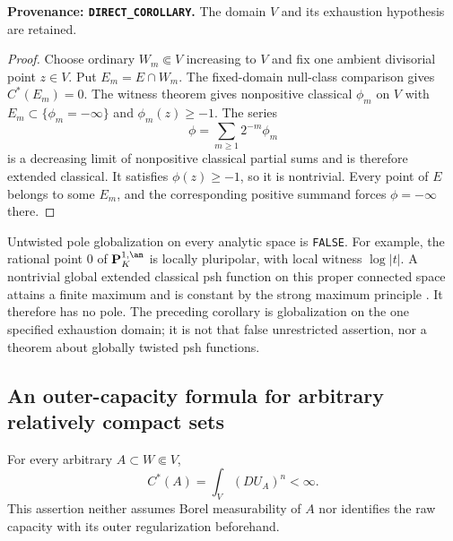 \noindent\textbf{Provenance: \texttt{DIRECT\_COROLLARY}.}
The domain $V$ and its exhaustion hypothesis are retained.

\begin{proof}
Choose ordinary $W_m\Subset V$ increasing to $V$ and fix one
ambient divisorial point $z\in V$. Put $E_m=E\cap W_m$.
The fixed-domain null-class comparison gives $C^*(E_m)=0$.
The witness theorem gives nonpositive classical $\phi_m$ on $V$
with $E_m\subset\{\phi_m=-\infty\}$ and $\phi_m(z)\geq-1$.
The series
\[
 \phi=\sum_{m\geq1}2^{-m}\phi_m
\]
is a decreasing limit of nonpositive classical partial sums and
is therefore extended classical. It satisfies $\phi(z)\geq-1$,
so it is nontrivial. Every point of $E$ belongs to some $E_m$,
and the corresponding positive summand forces $\phi=-\infty$
there.
\end{proof}

\begin{remark}
Untwisted pole globalization on every analytic space is
\texttt{FALSE}. For example, the rational point $0$ of
$\mathbf P^{1,\an}_K$ is locally pluripolar, with local witness
$\log|t|$. A nontrivial global extended classical psh function
on this proper connected space attains a finite maximum and is
constant by the strong maximum principle
\cite[Theorem 6.1]{GR25}. It therefore has no
pole. The preceding corollary is globalization on the one
specified exhaustion domain; it is not that false unrestricted
assertion, nor a theorem about globally twisted psh functions.
\end{remark}

\subsection{An outer-capacity formula for arbitrary relatively compact sets}

\begin{theorem}
\label{thm:r2-arbitrary-extremal-mass}
For every arbitrary $A\subset W\Subset V$,
\[
 C^*(A)=\int_V(DU_A)^n<\infty.
\]
This assertion neither assumes Borel measurability of $A$ nor
identifies the raw capacity with its outer regularization beforehand.
\end{theorem}

